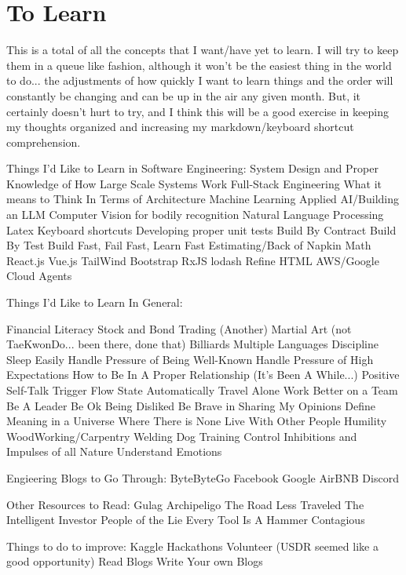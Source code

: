\documentclass{article}
\begin{document}
\section*{To Learn}
This is a total of all the concepts that I want/have yet to learn. I will try to keep them in a queue like fashion, although it won't be the easiest thing in the world to do... the adjustments of how quickly I want to learn things and the order will constantly be changing and can be up in the air any given month. But, it certainly doesn't hurt to try, and I think this will be a good exercise in keeping my thoughts organized and increasing my markdown/keyboard shortcut comprehension.

Things I'd Like to Learn in Software Engineering:
System Design and Proper Knowledge of How Large Scale Systems Work
Full-Stack Engineering
What it means to Think In Terms of Architecture
Machine Learning
Applied AI/Building an LLM
Computer Vision for bodily recognition
Natural Language Processing
Latex
Keyboard shortcuts
Developing proper unit tests
Build By Contract
Build By Test
Build Fast, Fail Fast, Learn Fast
Estimating/Back of Napkin Math
React.js
Vue.js
TailWind
Bootstrap
RxJS
lodash
Refine HTML
AWS/Google Cloud
Agents


Things I'd Like to Learn In General:

Financial Literacy
Stock and Bond Trading
(Another) Martial Art (not TaeKwonDo... been there, done that)
Billiards
Multiple Languages
Discipline
Sleep Easily
Handle Pressure of Being Well-Known
Handle Pressure of High Expectations
How to Be In A Proper Relationship (It's Been A While...)
Positive Self-Talk
Trigger Flow State Automatically
Travel Alone
Work Better on a Team
Be A Leader
Be Ok Being Disliked
Be Brave in Sharing My Opinions
Define Meaning in a Universe Where There is None
Live With Other People
Humility
WoodWorking/Carpentry
Welding
Dog Training
Control Inhibitions and Impulses of all Nature
Understand Emotions 


Engieering Blogs to Go Through:
ByteByteGo
Facebook
Google
AirBNB
Discord


Other Resources to Read:
Gulag Archipeligo
The Road Less Traveled
The Intelligent Investor
People of the Lie
Every Tool Is A Hammer
Contagious

Things to do to improve:
Kaggle
Hackathons
Volunteer (USDR seemed like a good opportunity)
Read Blogs
Write Your own Blogs
\end{document}
